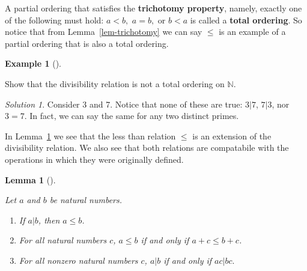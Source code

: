 \documentclass[
  twoside,
  12pt,
  letterpaper]{article}
\providecommand{\tightlist}{%
  \setlength{\itemsep}{0pt}\setlength{\parskip}{0pt}}\usepackage{longtable,booktabs,array}
\theoremstyle{definition}
\newtheorem{example}{Example}[section]
\theoremstyle{definition}
\theoremstyle{definition}
\theoremstyle{plain}
\newtheorem{lemma}{Lemma}[section]
\theoremstyle{plain}
\theoremstyle{remark}
\newtheorem*{solution}{Solution}
\begin{document}
A partial ordering that satisfies the \textbf{trichotomy property},
namely, exactly one of the following must hold: \(a < b,\) \(a = b,\) or
\(b < a\) is called a \textbf{total ordering}. So notice that from
Lemma~\ref{lem-trichotomy} we can say \(\leq\) is an example of a
partial ordering that is also a total ordering.

\begin{example}[]\protect\hypertarget{exm-div-trich}{}\label{exm-div-trich}

Show that the divisibility relation is not a total ordering on
\(\mathbb{N}\).

\end{example}

\begin{solution}

Consider 3 and 7. Notice that none of these are true: \(3|7\), \(7|3\),
nor \(3=7\). In fact, we can say the same for any two distinct primes.

\end{solution}

In Lemma~\ref{lem-ordering-props} we see that the less than relation
\(\leq\) is an extension of the divisibility relation. We also see that
both relations are compatabile with the operations in which they were
originally defined.

\begin{lemma}[]\protect\hypertarget{lem-ordering-props}{}\label{lem-ordering-props}

Let \(a\) and \(b\) be natural numbers.

\begin{enumerate}
\def\labelenumi{\arabic{enumi}.}
\tightlist
\item
  If \(a|b\), then \(a\leq b\).
\item
  For all natural numbers \(c\), \(a\leq b\) if and only if
  \(a+c\leq b+c\).
\item
  For all nonzero natural numbers \(c\), \(a|b\) if and only if
  \(ac|bc.\)
\end{enumerate}

\end{lemma}
\end{document}
